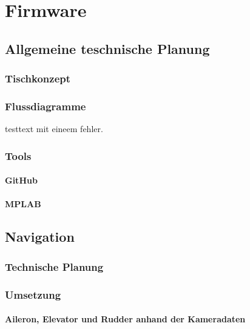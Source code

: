 \chapter{Firmware}
\renewcommand{\kapitelautor}{Autor: Lucas Ullrich}

\section{Allgemeine teschnische Planung}

  \subsection{Tischkonzept}

  \subsection{Flussdiagramme}
testtext mit eineem fehler.
  \subsection{Tools}

    \subsubsection{GitHub}

    \subsubsection{MPLAB}

\section{Navigation}

  \subsection{Technische Planung}

  \subsection{Umsetzung}
    \subsubsection{Aileron, Elevator und Rudder anhand der Kameradaten}

